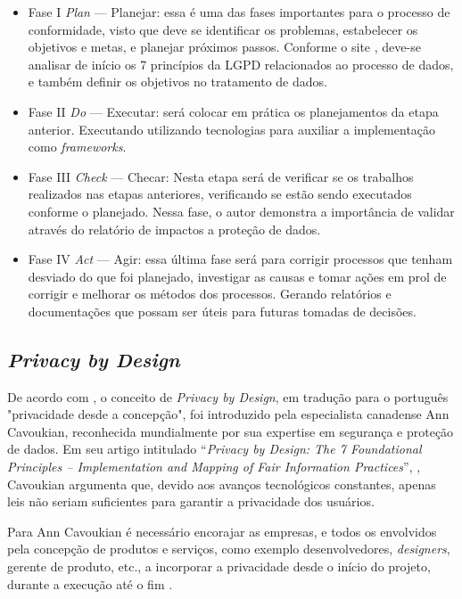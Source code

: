 \documentclass[
	12pt,				%
	openright,			%
	oneside,			%
	a4paper,			%
	english,			%
	french,				%
	spanish,			%
	brazil,				%
	]{abntex2}
\begin{document}
\begin{itemize}
\item Fase I  \textit{Plan} — Planejar: essa é uma das fases importantes para o processo de conformidade, visto que deve se identificar os problemas, estabelecer os objetivos e metas, e planejar próximos passos. Conforme o site , deve-se analisar de início os 7 princípios da LGPD relacionados ao processo de dados, e também definir os objetivos no tratamento de dados.
\item Fase II \textit{Do} — Executar: será colocar em prática os planejamentos da etapa anterior. Executando utilizando tecnologias para auxiliar a implementação como \textit{frameworks}.
\item Fase III \textit{Check} — Checar: Nesta etapa será de verificar se os trabalhos realizados nas etapas anteriores, verificando se estão sendo executados conforme o planejado. Nessa fase, o autor demonstra a importância de validar através do relatório de impactos a proteção de dados.
\item Fase IV \textit{Act} — Agir:  essa última fase será para corrigir processos que tenham desviado do que foi planejado, investigar as causas e tomar ações em prol de corrigir e melhorar os métodos dos processos. Gerando relatórios e documentações que possam ser úteis para futuras tomadas de decisões.
\end{itemize}

\subsection{ \textit{Privacy by Design}  }

De acordo com \cite{oliveira2020}, o conceito de \textit{Privacy by Design}, em tradução para o português "privacidade desde a concepção", foi introduzido pela especialista canadense Ann Cavoukian, reconhecida mundialmente por sua expertise em segurança e proteção de dados. Em seu artigo intitulado “\textit{Privacy by Design: The 7 Foundational Principles – Implementation and Mapping of Fair Information Practices}”, \cite{Jimene2020}, Cavoukian argumenta que, devido aos avanços tecnológicos constantes, apenas leis não seriam suficientes para garantir a privacidade dos usuários. 

Para Ann Cavoukian é necessário encorajar as empresas, e todos os envolvidos pela concepção de produtos e serviços, como exemplo desenvolvedores, \textit{designers}, gerente de produto, etc., a incorporar a privacidade desde o início do projeto, durante a execução até o fim \cite{Vainzof2020}. 
\end{document}
